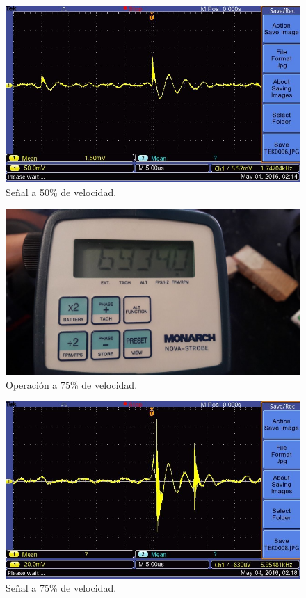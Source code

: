   \begin{figure}[!htbp]
 \centering
 \includegraphics [scale=0.25]
 {./img/tek0006.jpg}
  \caption{Se\~nal a 50\% de velocidad.}
 \end{figure}

  \begin{figure}[!htbp]
 \centering
 \includegraphics [scale=0.2]
 {./img/6934.jpg}
  \caption{Operaci\'on a 75\% de velocidad.}
 \end{figure}

  \begin{figure}[!htbp]
 \centering
 \includegraphics [scale=0.25]
 {./img/tek0008.jpg}
  \caption{Se\~nal a 75\% de velocidad.}
 \end{figure}

